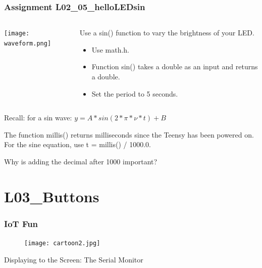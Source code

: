 \documentclass{beamer}
\begin{document}
\begin{frame}\frametitle{Assignment L02\_05\_helloLEDsin}
\begin{columns}
\begin{column}{4.5cm}
\begin{overprint}
\texttt{[image: waveform.png]}
\end{overprint}
\end{column}
\begin{column}{5cm}
Use a sin() function to vary the brightness of your LED.
\begin{itemize}
\item Use math.h.
\item Function sin() takes a double as an input and returns a double.
\item Set the period to 5 seconds.
\end{itemize}
\end{column}
\end{columns}

\vspace{0.25cm}

Recall: for a sin wave: $y = A * sin(2*\pi*\nu*t) + B$

\vspace{0.25cm}

The function millis() returns milliseconds since the Teensy has been powered on. For the sine equation, use t = millis() / 1000.0. 

\vspace{0.5cm}

Why is adding the decimal after 1000 important?
\end{frame}

\section{L03\_Buttons}

\begin{frame}\frametitle{IoT Fun}
\begin{figure}[h]
	\texttt{[image: cartoon2.jpg]}
\end{figure}
\end{frame}


\begin{frame}{Displaying to the Screen: The Serial Monitor}
\lstIV
\end{frame}
\end{document}
